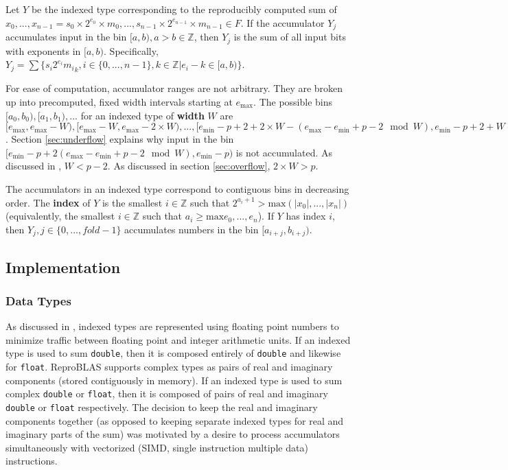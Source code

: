 \documentclass[12pt]{article}
\providecommand{\Z}{\ensuremath{\mathbb{Z}}}
\providecommand{\min}{\ensuremath{\text{min}}}
\providecommand{\max}{\ensuremath{\text{max}}}
\theoremstyle{plain}
\begin{document}
    Let $Y$ be the indexed type corresponding to the reproducibly computed sum of $x_0, ..., x_{n - 1} = s_0 \times 2^{e_0} \times m_0, ..., s_{n - 1} \times 2^{e_{n - 1}} \times m_{n - 1} \in F$.
    If the accumulator $Y_j$ accumulates input in the bin $[a, b), a > b \in \Z$, then $Y_j$ is the sum of all input bits with exponents in $[a, b)$. Specifically, $Y_j = \sum \{s_i2^{e_i}{m_i}_k, i \in \{0, ..., n - 1\}, k \in \Z | e_i - k \in [a, b)\}$.

    For ease of computation, accumulator ranges are not arbitrary. They are broken up into precomputed, fixed width intervals starting at $e_{\max}$. The possible bins $[a_0, b_0), [a_1, b_1), ...$ for an indexed type of \textbf{width} $W$ are $[e_{\max}, e_{\max} - W), [e_{\max} - W, e_{\max} - 2\times W), ..., [e_{\min} - p + 2 + 2\times W - (e_{\max} - e_{\min} + p - 2 \mod W), e_{\min} - p + 2 + W - (e_{\max} - e_{\min} + p - 2 \mod W))$. Section \ref{sec:underflow} explains why input in the bin $[e_{\min} - p + 2 (e_{\max} - e_{\min} + p - 2 \mod W), e_{\min} - p)$ is not accumulated. As discussed in \cite{repsum}, $W < p - 2$. As discussed in section \ref{sec:overflow}, $2\times W > p$.

    The accumulators in an indexed type correspond to contiguous bins in decreasing order. The \textbf{index} of $Y$ is the smallest $i \in \Z$ such that $2^{a_i + 1} > \max(|x_0|, ..., |x_n|)$ (equivalently, the smallest $i \in \Z$ such that $a_i \geq \max{e_0, ..., e_n}$). If $Y$ has index $i$, then $Y_j, j \in \{0, ..., fold - 1\}$ accumulates numbers in the bin $[a_{i + j}, b_{i + j})$.

  \subsection{Implementation}
    \subsubsection{Data Types}
      As discussed in \cite{repsum}, indexed types are represented using floating point numbers to minimize traffic between floating point and integer arithmetic units. If an indexed type is used to sum \verb|double|, then it is composed entirely of \verb|double| and likewise for \verb|float|. ReproBLAS supports complex types as pairs of real and imaginary components (stored contiguously in memory). If an indexed type is used to sum complex \verb|double| or \verb|float|, then it is composed of pairs of real and imaginary \verb|double| or \verb|float| respectively. The decision to keep the real and imaginary components together (as opposed to keeping separate indexed types for real and imaginary parts of the sum) was motivated by a desire to process accumulators simultaneously with vectorized (SIMD, single instruction multiple data) instructions.
\end{document}
